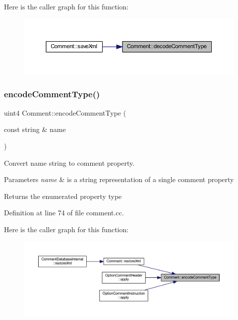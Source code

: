 Here is the caller graph for this function\+:
\nopagebreak
\begin{figure}[H]
\begin{center}
\leavevmode
\includegraphics[width=350pt]{class_comment_af30bb24a512fb5f9ed352be71a26ff2d_icgraph}
\end{center}
\end{figure}
\mbox{\label{class_comment_acc7b6ccc5f0d5645e1304952f3d08292}} 
\subsubsection{\texorpdfstring{encodeCommentType()}{encodeCommentType()}}
{\footnotesize\ttfamily uint4 Comment\+::encode\+Comment\+Type (\begin{DoxyParamCaption}\item[{const string \&}]{name }\end{DoxyParamCaption})\hspace{0.3cm}{\ttfamily [static]}}



Convert name string to comment property. 


\begin{DoxyParams}{Parameters}
{\em name} & is a string representation of a single comment property \\
\hline
\end{DoxyParams}
\begin{DoxyReturn}{Returns}
the enumerated property type 
\end{DoxyReturn}


Definition at line 74 of file comment.\+cc.

Here is the caller graph for this function\+:
\nopagebreak
\begin{figure}[H]
\begin{center}
\leavevmode
\includegraphics[width=350pt]{class_comment_acc7b6ccc5f0d5645e1304952f3d08292_icgraph}
\end{center}
\end{figure}
\mbox{\label{class_comment_abdcb4c6ccdf8d7c9c5652c4d357c0ed6}} 
